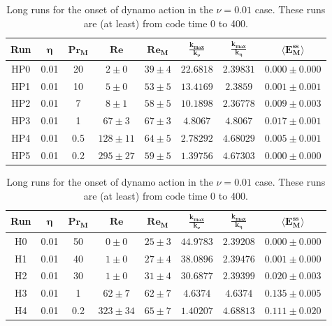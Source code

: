 \documentclass[12pt,a4paper]{report}
\begin{document}
\begin{table}[ht]
\begin{center}
\begin{tabular}{||c|c|c|c|c|c|c|c||}
\hline
\textbf{Run} & $ \bm{\eta} $ & $ \bm{ Pr_M} $ & $ \bm{ Re} $ & $ \bm{ Re_M} $ & $ \bm{ \frac{k_{max}}{k_\nu}} $ & $ \bm{ \frac{k_{max}}{k_\eta}} $ & $ \bm{ \langle E_M^{ss}} \rangle $ \\ \hline
HP0 & 0.01 & 20 & $ 2 \pm 0 $ & $ 39 \pm 4 $ & $ 22.6818 $ & $ 2.39831 $ & $ 0.000 \pm 0.000 $ \\ \hline
HP1 & 0.01 & 10 & $ 5 \pm 0 $ & $ 53 \pm 5 $ & $ 13.4169 $ & $ 2.3859 $ & $ 0.001 \pm 0.001 $ \\ \hline
HP2 & 0.01 & 7 & $ 8 \pm 1 $ & $ 58 \pm 5 $ & $ 10.1898 $ & $ 2.36778 $ & $ 0.009 \pm 0.003 $ \\ \hline
HP3 & 0.01 & 1 & $ 67 \pm 3 $ & $ 67 \pm 3 $ & $ 4.8067 $ & $ 4.8067 $ & $ 0.017 \pm 0.001 $ \\ \hline
HP4 & 0.01 & 0.5 & $ 128 \pm 11 $ & $ 64 \pm 5 $ & $ 2.78292 $ & $ 4.68029 $ & $ 0.005 \pm 0.001 $ \\ \hline
HP5 & 0.01 & 0.2 & $ 295 \pm 27 $ & $ 59 \pm 5 $ & $ 1.39756 $ & $ 4.67303 $ & $ 0.000 \pm 0.000 $ \\ \hline
\end{tabular}
\end{center}
\caption{Long runs for the onset of dynamo action in the $\nu=0.01$ case. These runs are (at least) from code time 0 to 400.}
\label{tableB4}
\end{table}

\begin{table}[ht]
\begin{center}
\begin{tabular}{||c|c|c|c|c|c|c|c||}
\hline
\textbf{Run} & $ \bm{\eta} $ & $ \bm{ Pr_M} $ & $ \bm{ Re} $ & $ \bm{ Re_M} $ & $ \bm{ \frac{k_{max}}{k_\nu}} $ & $ \bm{ \frac{k_{max}}{k_\eta}} $ & $ \bm{ \langle E_M^{ss}} \rangle $ \\ \hline
H0 & 0.01 & 50 & $ 0 \pm 0 $ & $ 25 \pm 3 $ & $ 44.9783 $ & $ 2.39208 $ & $ 0.000 \pm 0.000 $ \\ \hline
H1 & 0.01 & 40 & $ 1 \pm 0 $ & $ 27 \pm 4 $ & $ 38.0896 $ & $ 2.39476 $ & $ 0.001 \pm 0.000 $ \\ \hline
H2 & 0.01 & 30 & $ 1 \pm 0 $ & $ 31 \pm 4 $ & $ 30.6877 $ & $ 2.39399 $ & $ 0.020 \pm 0.003 $ \\ \hline
H3 & 0.01 & 1 & $ 62 \pm 7 $ & $ 62 \pm 7 $ & $ 4.6374 $ & $ 4.6374 $ & $ 0.135 \pm 0.005 $ \\ \hline
H4 & 0.01 & 0.2 & $ 323 \pm 34 $ & $ 65 \pm 7 $ & $ 1.40207 $ & $ 4.68813 $ & $ 0.111 \pm 0.020 $ \\ \hline
\end{tabular}
\end{center}
\caption{Long runs for the onset of dynamo action in the $\nu=0.01$ case. These runs are (at least) from code time 0 to 400.}
\label{tableB5}
\end{table}






\end{document}
